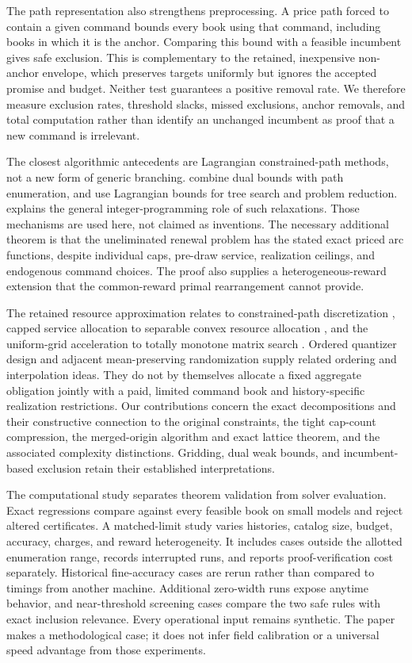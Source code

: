 The path representation also strengthens preprocessing. A price path forced to contain a given command bounds every book using that command, including books in which it is the anchor. Comparing this bound with a feasible incumbent gives safe exclusion. This is complementary to the retained, inexpensive non-anchor envelope, which preserves targets uniformly but ignores the accepted promise and budget. Neither test guarantees a positive removal rate. We therefore measure exclusion rates, threshold slacks, missed exclusions, anchor removals, and total computation rather than identify an unchanged incumbent as proof that a new command is irrelevant.

The closest algorithmic antecedents are Lagrangian constrained-path methods, not a new form of generic branching. \citet{HandlerZang1980} combine dual bounds with path enumeration, and \citet{BeasleyChristofides1989} use Lagrangian bounds for tree search and problem reduction. \citet{Fisher1981} explains the general integer-programming role of such relaxations. Those mechanisms are used here, not claimed as inventions. The necessary additional theorem is that the uneliminated renewal problem has the stated exact priced arc functions, despite individual caps, pre-draw service, realization ceilings, and endogenous command choices. The proof also supplies a heterogeneous-reward extension that the common-reward primal rearrangement cannot provide.

The retained resource approximation relates to constrained-path discretization \citep{Hassin1992,LorenzRaz2001}, capped service allocation to separable convex resource allocation \citep{Patriksson2008}, and the uniform-grid acceleration to totally monotone matrix search \citep{Aggarwal1987}. Ordered quantizer design \citep{Wu1991} and adjacent mean-preserving randomization \citep{PagesWilbertz2012} supply related ordering and interpolation ideas. They do not by themselves allocate a fixed aggregate obligation jointly with a paid, limited command book and history-specific realization restrictions. Our contributions concern the exact decompositions and their constructive connection to the original constraints, the tight cap-count compression, the merged-origin algorithm and exact lattice theorem, and the associated complexity distinctions. Gridding, dual weak bounds, and incumbent-based exclusion retain their established interpretations.

The computational study separates theorem validation from solver evaluation. Exact regressions compare against every feasible book on small models and reject altered certificates. A matched-limit study varies histories, catalog size, budget, accuracy, charges, and reward heterogeneity. It includes cases outside the allotted enumeration range, records interrupted runs, and reports proof-verification cost separately. Historical fine-accuracy cases are rerun rather than compared to timings from another machine. Additional zero-width runs expose anytime behavior, and near-threshold screening cases compare the two safe rules with exact inclusion relevance. Every operational input remains synthetic. The paper makes a methodological case; it does not infer field calibration or a universal speed advantage from those experiments.

